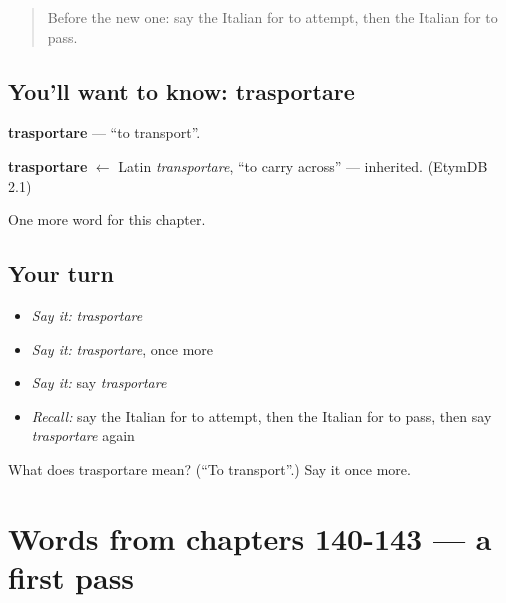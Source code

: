 \label{lesson:IT-C148-trasportare}



\begin{quote}
Before the new one: say the Italian for to attempt, then the Italian for to pass.
\end{quote}

\subsection*{You'll want to know: trasportare}
\textbf{trasportare} — \textquotedblleft{}to transport\textquotedblright{}.

\begin{cousinweb}
\textbf{trasportare} $\leftarrow$ Latin \emph{transportare}, \textquotedblleft{}to carry across\textquotedblright{} — inherited. (EtymDB 2.1)
\end{cousinweb}

\begin{grammarlens}[title={What you've built}]
One more word for this chapter.
\end{grammarlens}

\subsection*{Your turn}
\begin{itemize}
\raggedright
  \item \emph{Say it:} \emph{trasportare}
  \item \emph{Say it:} \emph{trasportare}, once more
  \item \emph{Say it:} say \emph{trasportare}
  \item \emph{Recall:} say the Italian for to attempt, then the Italian for to pass, then say \emph{trasportare} again
\end{itemize}

\begin{tcolorbox}[breakable,colback=teal!4,colframe=teal!35!black,title={Before you move on}]
What does trasportare mean? (\textquotedblleft{}To transport\textquotedblright{}.) Say it once more.
\end{tcolorbox}
\section[(dialogue)]{Words from chapters 140-143 — a first pass}

\label{lesson:IT-R148-first-pass-words-from-chapters-140-143}



